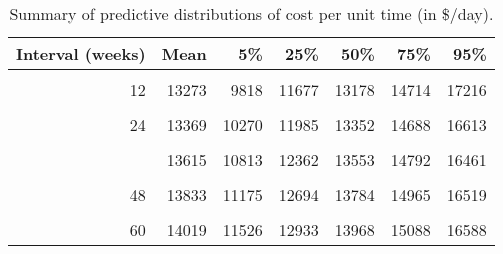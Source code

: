 \begin{table}
\centering
\caption{\label{tab:cost-per-unit-time}Summary of predictive distributions of cost per unit time (in \$/day).}
\centering
\begin{tabular}[t]{rrrrrrr}
\toprule
Interval (weeks) & Mean & 5\% & 25\% & 50\% & 75\% & 95\%\\
\midrule
\cellcolor{gray!10}{6} & \cellcolor{gray!10}{13857} & \cellcolor{gray!10}{10059} & \cellcolor{gray!10}{12060} & \cellcolor{gray!10}{13704} & \cellcolor{gray!10}{15491} & \cellcolor{gray!10}{18135}\\
12 & 13273 & 9818 & 11677 & 13178 & 14714 & 17216\\
\cellcolor{gray!10}{18} & \cellcolor{gray!10}{13267} & \cellcolor{gray!10}{10000} & \cellcolor{gray!10}{11811} & \cellcolor{gray!10}{13217} & \cellcolor{gray!10}{14622} & \cellcolor{gray!10}{16792}\\
24 & 13369 & 10270 & 11985 & 13352 & 14688 & 16613\\
\cellcolor{gray!10}{30} & \cellcolor{gray!10}{13498} & \cellcolor{gray!10}{10575} & \cellcolor{gray!10}{12219} & \cellcolor{gray!10}{13434} & \cellcolor{gray!10}{14724} & \cellcolor{gray!10}{16480}\\
\addlinespace
36 & 13615 & 10813 & 12362 & 13553 & 14792 & 16461\\
\cellcolor{gray!10}{42} & \cellcolor{gray!10}{13725} & \cellcolor{gray!10}{10984} & \cellcolor{gray!10}{12516} & \cellcolor{gray!10}{13649} & \cellcolor{gray!10}{14844} & \cellcolor{gray!10}{16498}\\
48 & 13833 & 11175 & 12694 & 13784 & 14965 & 16519\\
\cellcolor{gray!10}{54} & \cellcolor{gray!10}{13930} & \cellcolor{gray!10}{11362} & \cellcolor{gray!10}{12806} & \cellcolor{gray!10}{13872} & \cellcolor{gray!10}{15016} & \cellcolor{gray!10}{16525}\\
60 & 14019 & 11526 & 12933 & 13968 & 15088 & 16588\\
\bottomrule
\end{tabular}
\end{table}
